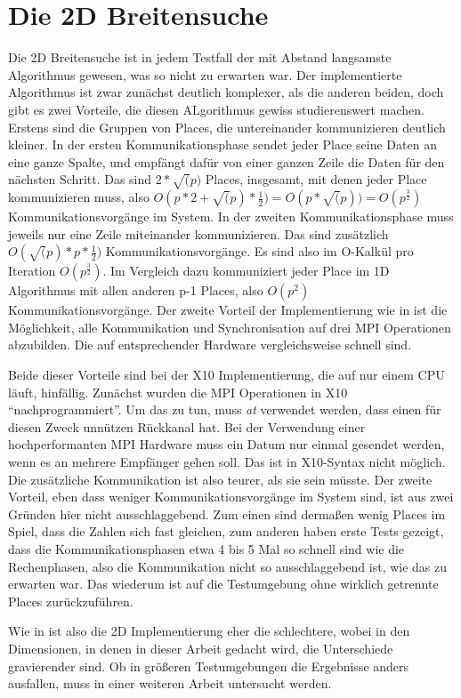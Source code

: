 




\section{Die 2D Breitensuche} %
\label{sec:die_2d_breitensuche}
Die 2D Breitensuche ist in jedem Testfall der mit Abstand langsamste Algorithmus gewesen, was so nicht zu erwarten war. Der implementierte Algorithmus ist zwar zunächst deutlich komplexer, als die anderen beiden, doch gibt es zwei Vorteile, die diesen ALgorithmus gewiss studierenswert machen. Erstens sind die Gruppen von Places, die untereinander kommunizieren deutlich kleiner. In der ersten Kommunikationsphase sendet jeder Place seine Daten an eine ganze Spalte, und empfängt dafür von einer ganzen Zeile die Daten für den nächsten Schritt. Das sind $2 * \sqrt(p)$ Places, insgesamt, mit denen jeder Place kommunizieren muss, also $O(p * 2 + \sqrt(p) * \frac{1}{2}) = O(p * \sqrt(p))= O(p^{\frac{3}{2}})$ Kommunikationsvorgänge im System. In der zweiten Kommunikationsphase muss jeweils nur eine Zeile miteinander kommunizieren. Das sind zusätzlich $O(\sqrt(p) * p * \frac{1}{2})$ Kommunikationsvorgänge. Es sind also im O-Kalkül pro Iteration $O(p^{\frac{3}{2}})$. Im Vergleich dazu kommuniziert jeder Place im 1D Algorithmus mit allen anderen p-1 Places, also $O(p^2)$ Kommunikationsvorgänge. Der zweite Vorteil der Implementierung wie in \cite{Buluc:2011} ist die Möglichkeit, alle Kommunikation und Synchronisation auf drei MPI Operationen abzubilden. Die auf entsprechender Hardware vergleichsweise schnell sind. 

Beide dieser Vorteile sind bei der X10 Implementierung, die auf nur einem CPU läuft, hinfällig. Zunächst wurden die MPI Operationen in X10 \enquote{nachprogrammiert}. Um das zu tun, muss \textit{at} verwendet werden, dass einen für diesen Zweck unnützen Rückkanal hat. Bei der Verwendung einer hochperformanten MPI Hardware muss ein Datum nur einmal gesendet werden, wenn es an mehrere Empfänger gehen soll. Das ist in X10-Syntax nicht möglich. Die zusätzliche Kommunikation ist also teurer, als sie sein müsste. 
Der zweite Vorteil, eben dass weniger Kommunikationsvorgänge im System sind, ist aus zwei Gründen hier nicht ausschlaggebend. Zum einen sind dermaßen wenig Places im Spiel, dass die Zahlen sich fast gleichen, zum anderen haben erste Tests gezeigt, dass die Kommunikationsphasen etwa 4 bis 5 Mal so schnell sind wie die Rechenphasen, also die Kommunikation nicht so ausschlaggebend ist, wie das zu erwarten war. Das wiederum ist auf die Testumgebung ohne wirklich getrennte Places zurückzuführen.

Wie in \cite{Buluc:2011} ist also die 2D Implementierung eher die schlechtere, wobei in den Dimensionen, in denen in dieser Arbeit gedacht wird,  die Unterschiede gravierender sind. Ob in  größeren Testumgebungen die Ergebnisse anders ausfallen, muss in einer weiteren Arbeit untersucht werden.
